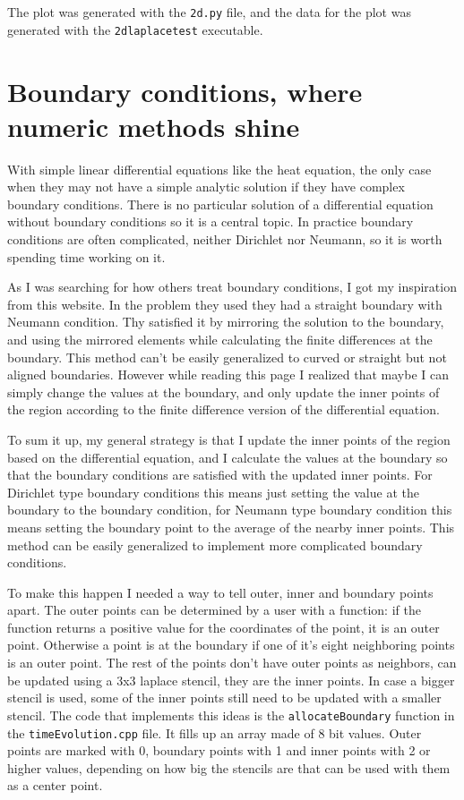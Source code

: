 \documentclass[pdftex,12pt,a4paper]{article}
\begin{document}
		The plot was generated with the \texttt{2d.py} file, and the data for the plot was generated with the \texttt{2dlaplacetest} executable.
	\section{Boundary conditions, where numeric methods shine}
		With simple linear differential equations like the heat equation, the only case when they may not have a simple analytic solution if they have complex boundary conditions. There is no particular solution of a differential equation without boundary conditions so it is a central topic. In practice boundary conditions are often complicated, neither Dirichlet nor Neumann, so it is worth spending time working on it.
		
		As I was searching for how others treat boundary conditions, I got my inspiration from this website. \cite{lectureNotes} In the problem they used they had a straight boundary with Neumann condition. Thy satisfied it by mirroring the solution to the boundary, and using the mirrored elements while calculating the finite differences at the boundary. This method can't be easily generalized to curved or straight but not aligned boundaries. However while reading this page I realized that maybe I can simply change the values at the boundary, and only update the inner points of the region according to the finite difference version of the differential equation.
		
		To sum it up, my general strategy is that I update the inner points of the region based on the differential equation, and I calculate the values at the boundary so that the boundary conditions are satisfied with the updated inner points. For Dirichlet type boundary conditions this means just setting the value at the boundary to the boundary condition, for Neumann type boundary condition this means setting the boundary point to the average of the nearby inner points. This method can be easily generalized to implement more complicated boundary conditions.
		
		To make this happen I needed a way to tell outer, inner and boundary points apart. The outer points can be determined by a user with a function: if the function returns a positive value for the coordinates of the point, it is an outer point. Otherwise a point is at the boundary if one of it's eight neighboring points is an outer point. The rest of the points don't have outer points as neighbors, can be updated using a 3x3 laplace stencil, they are the inner points. In case a bigger stencil is used, some of the inner points still need to be updated with a smaller stencil. The code that implements this ideas is the \texttt{allocateBoundary} function in the \texttt{timeEvolution.cpp} file. It fills up an array made of 8 bit values. Outer points are marked with 0, boundary points with 1 and inner points with 2 or higher values, depending on how big the stencils are that can be used with them as a center point.
\end{document}
